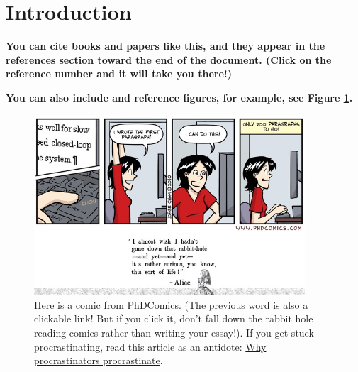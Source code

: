 \section{Introduction}
 
\textbf{You can cite books \cite{Feynman1998} and papers \cite{Lee2016} like this, and they appear in the references section toward the end of the document. (Click on the reference number and it will take you there!)}

\lipsum[5-7] %

\textbf{You can also include and reference figures, for example, see Figure \ref{fig:example}.}
 
\begin{figure}[h]
    \centering
    \includegraphics[width=0.9\textwidth]{./images/phd022410s.jpg}
    \caption{Here is a comic from \href{http://phdcomics.com/comics/archive.php?comicid=1285}{PhDComics}. (The previous word is also a clickable link! But if you click it, don't fall down the rabbit hole reading comics rather than writing your essay!). If you get stuck procrastinating, read this article as an antidote: \href{https://www.waitbutwhy.com/2013/10/why-procrastinators-procrastinate.html}{Why procrastinators procrastinate}. }
    \label{fig:example}
\end{figure}

